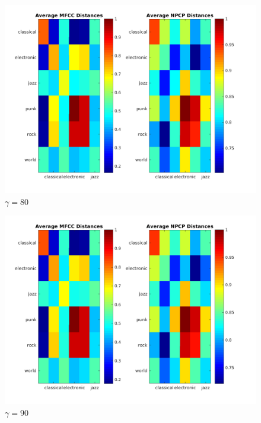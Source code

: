 \documentclass[11pt, a4paper]{article}
\begin{document}
\begin{figure}[H]
\hspace*{-2cm}    
    \centering
    \includegraphics[width=1.25\textwidth]{average80.png}
    \caption{$\gamma = 80$}
\end{figure}


\begin{figure}[H]
\hspace*{-2cm}    
    \centering
    \includegraphics[width=1.25\textwidth]{average90.png}
    \caption{$\gamma = 90$}
\end{figure}
\end{document}
